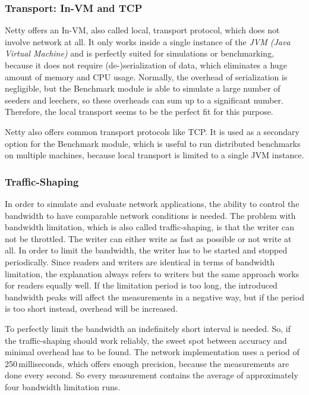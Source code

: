 \subsubsection{Transport: In-VM and TCP}
\label{module:core:net:transport}
Netty offers an In-VM, also called local, transport protocol, which does not involve network at all. It only works inside a single instance of the \emph{JVM (Java Virtual Machine)} and is perfectly suited for simulations or benchmarking, because it does not require (de-)serialization of data, which eliminates a huge amount of memory and CPU usage. Normally, the overhead of serialization is negligible, but the Benchmark module is able to simulate a large number of seeders and leechers, so these overheads can sum up to a significant number. Therefore, the local transport seems to be the perfect fit for this purpose.

Netty also offers common transport protocols like TCP. It is used as a secondary option for the Benchmark module, which is useful to run distributed benchmarks on multiple machines, because local transport is limited to a single JVM instance.


\subsubsection{Traffic-Shaping}
\label{module:core:net:traffic}
In order to simulate and evaluate network applications, the ability to control the bandwidth to have comparable network conditions is needed. The problem with bandwidth limitation, which is also called traffic-shaping, is that the writer can not be throttled. The writer can either write as fast as possible or not write at all. In order to limit the bandwidth, the writer has to be started and stopped periodically. Since readers and writers are identical in terms of bandwidth limitation, the explanation always refers to writers but the same approach works for readers equally well. If the limitation period is too long, the introduced bandwidth peaks will affect the measurements in a negative way, but if the period is too short instead, overhead will be increased. 

To perfectly limit the bandwidth an indefinitely short interval is needed. So, if the traffic-shaping should work reliably, the sweet spot between accuracy and minimal overhead has to be found. The network implementation uses a period of 250\,milliseconds, which offers enough precision, because the measurements are done every second. So every measurement contains the average of approximately four bandwidth limitation runs.


